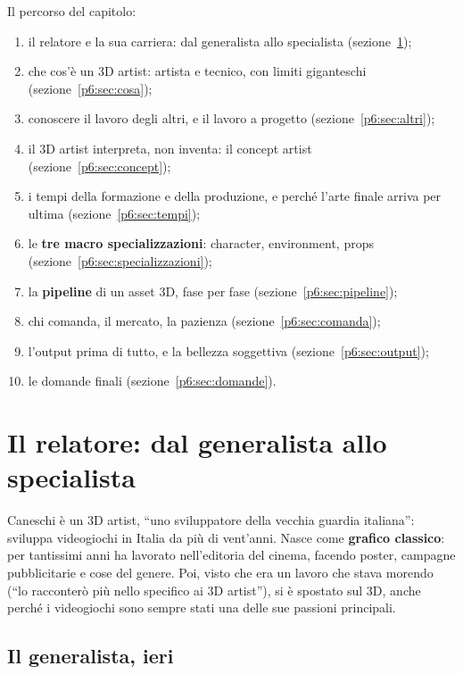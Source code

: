 Il percorso del capitolo:
\begin{enumerate}
  \item il relatore e la sua carriera: dal generalista allo specialista
        (sezione~\ref{p6:sec:relatore});
  \item che cos'è un 3D artist: artista e tecnico, con limiti giganteschi
        (sezione~\ref{p6:sec:cosa});
  \item conoscere il lavoro degli altri, e il lavoro a progetto
        (sezione~\ref{p6:sec:altri});
  \item il 3D artist interpreta, non inventa: il concept artist
        (sezione~\ref{p6:sec:concept});
  \item i tempi della formazione e della produzione, e perché l'arte finale
        arriva per ultima (sezione~\ref{p6:sec:tempi});
  \item le \textbf{tre macro specializzazioni}: character, environment,
        props (sezione~\ref{p6:sec:specializzazioni});
  \item la \textbf{pipeline} di un asset 3D, fase per fase
        (sezione~\ref{p6:sec:pipeline});
  \item chi comanda, il mercato, la pazienza
        (sezione~\ref{p6:sec:comanda});
  \item l'output prima di tutto, e la bellezza soggettiva
        (sezione~\ref{p6:sec:output});
  \item le domande finali (sezione~\ref{p6:sec:domande}).
\end{enumerate}

\section{Il relatore: dal generalista allo specialista}
\label{p6:sec:relatore}

Caneschi è un 3D artist, ``uno sviluppatore della vecchia guardia italiana'':
sviluppa videogiochi in Italia da più di vent'anni. Nasce come \textbf{grafico
classico}: per tantissimi anni ha lavorato nell'editoria del cinema, facendo
poster, campagne pubblicitarie e cose del genere. Poi, visto che era un lavoro
che stava morendo (``lo racconterò più nello specifico ai 3D artist''), si è
spostato sul 3D, anche perché i videogiochi sono sempre stati una delle sue
passioni principali.

\subsection{Il generalista, ieri}

